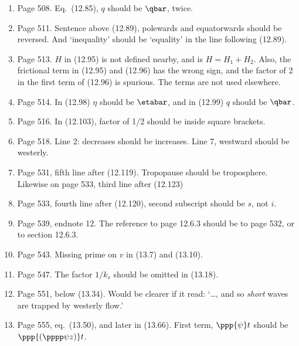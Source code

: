 \documentclass[10pt]{article}
\newcommand{\eq}{eq.\ } \newcommand{\Eq}{Eq.\ }
\begin{document}
\begin{enumerate}
\item Page 508. \Eq (12.85), $q$ should be $\qbar$, twice.

\item Page 511. Sentence above (12.89), polewards and equatorwards should be reversed. And `inequality' should be `equality' in the line following (12.89).

\item Page 513. $H$ in (12.95) is not defined nearby, and is $H = H_1 + H_2$. Also, the frictional term in (12.95) and (12.96) has the wrong sign, and the factor of 2 in the first term of (12.96) is spurious. The terms are not used elsewhere.

\item Page 514. In (12.98) $\eta$ should be $\etabar$, and in (12.99) $q$ should be $\qbar$.

\item Page 516. In (12.103), factor of 1/2 should be inside square brackets.

\item Page 518. Line 2: decreases should be increases. Line 7, westward should be westerly.

\item Page 531, fifth line after (12.119). Tropopause should be troposphere. Likewise on page 533, third line after (12.123)

\item Page 533, fourth line after (12.120), second subscript should be $s$, not $i$.

\item Page 539, endnote 12. The reference to page 12.6.3 should be to page 532, or to section 12.6.3.

\item Page 543. Missing prime on $v$ in (13.7) and (13.10).

\item Page 547. The factor $1/k_s$ should be omitted in (13.18).

\item Page 551, below (13.34). Would be clearer if it read: `\ldots, and so \emph{short} waves are trapped by westerly flow.'

\item Page 555, \eq (13.50), and later in (13.66). First term, $\ppp{\psi} t$ should be $\ppp{ (\pppp \psi z)} t$.



\end{enumerate}
\end{document}

